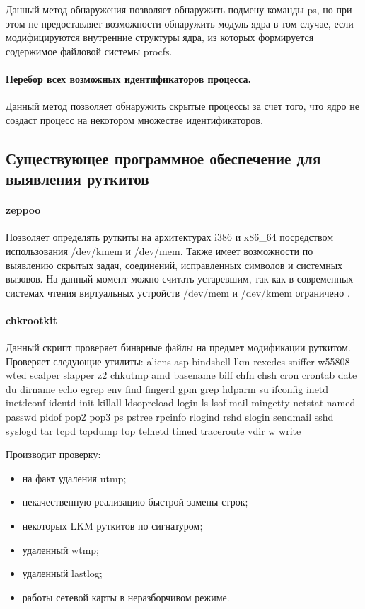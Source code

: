 \documentclass{gost7.32-2001}
\begin{document}
Данный метод обнаружения позволяет обнаружить подмену команды ps, но
при этом не предоставляет возможности обнаружить модуль ядра в том
случае, если модифицируются внутренние структуры ядра, из которых
формируется содержимое файловой системы procfs.

\newpage
\paragraph{Перебор всех возможных идентификаторов процесса.}

Данный метод позволяет обнаружить скрытые процессы за счет того, что
ядро не создаст процесс на некотором множестве идентификаторов.

\subsection{Существующее программное обеспечение для выявления руткитов}
\paragraph{zeppoo}

Позволяет определять руткиты на архитектурах i386 и x86\_64
посредством использования /dev/kmem и /dev/mem. Также имеет
возможности по выявлению скрытых задач, соединений, исправленных
символов и системных вызовов. На данный момент можно считать
устаревшим, так как в современных системах чтения виртуальных
устройств /dev/mem и /dev/kmem ограничено
.

\paragraph{chkrootkit}

Данный скрипт проверяет бинарные файлы на предмет модификации
руткитом. Проверяет следующие утилиты: aliens asp bindshell lkm
rexedcs sniffer w55808 wted scalper slapper z2 chkutmp amd basename
biff chfn chsh cron crontab date du dirname echo egrep env find
fingerd gpm grep hdparm su ifconfig inetd inetdconf identd init
killall ldsopreload login ls lsof mail mingetty netstat named passwd
pidof pop2 pop3 ps pstree rpcinfo rlogind rshd slogin sendmail sshd
syslogd tar tcpd tcpdump top telnetd timed traceroute vdir w write

Производит проверку:
\begin{itemize}
\item
  на факт удаления utmp;
\item
  некачественную реализацию быстрой замены строк;
\item
  некоторых LKM руткитов по сигнатуром;
\item
  удаленный wtmp;
\item
  удаленный lastlog;
\item
  работы сетевой карты в неразборчивом режиме.
\end{itemize}
\end{document}
